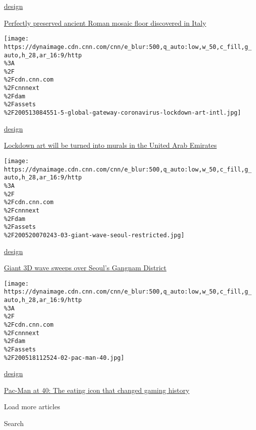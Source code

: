 \href{/style/design}{design}

\href{/style/article/negrar-mosaic-floor-italy-discovery-scli-intl/index.html}{Perfectly
preserved ancient Roman mosaic floor discovered in Italy}

\href{/style/article/dubai-lockdown-art-spc-intl/index.html}{}

\texttt{[image: https://dynaimage.cdn.cnn.com/cnn/e\_blur:500,q\_auto:low,w\_50,c\_fill,g\_auto,h\_28,ar\_16:9/http\\\%3A\\\%2F\\\%2Fcdn.cnn.com\\\%2Fcnnnext\\\%2Fdam\\\%2Fassets\\\%2F200513084551-5-global-gateway-coronavirus-lockdown-art-intl.jpg]}

\href{/style/design}{design}

\href{/style/article/dubai-lockdown-art-spc-intl/index.html}{Lockdown
art will be turned into murals in the United Arab Emirates}

\href{/style/article/3d-wave-in-seoul/index.html}{}

\texttt{[image: https://dynaimage.cdn.cnn.com/cnn/e\_blur:500,q\_auto:low,w\_50,c\_fill,g\_auto,h\_28,ar\_16:9/http\\\%3A\\\%2F\\\%2Fcdn.cnn.com\\\%2Fcnnnext\\\%2Fdam\\\%2Fassets\\\%2F200520070243-03-giant-wave-seoul-restricted.jpg]}

\href{/style/design}{design}

\href{/style/article/3d-wave-in-seoul/index.html}{Giant 3D wave sweeps
over Seoul's Gangnam District}

\href{/style/article/pac-man-40-anniversary-history/index.html}{}

\texttt{[image: https://dynaimage.cdn.cnn.com/cnn/e\_blur:500,q\_auto:low,w\_50,c\_fill,g\_auto,h\_28,ar\_16:9/http\\\%3A\\\%2F\\\%2Fcdn.cnn.com\\\%2Fcnnnext\\\%2Fdam\\\%2Fassets\\\%2F200518112524-02-pac-man-40.jpg]}

\href{/style/design}{design}

\href{/style/article/pac-man-40-anniversary-history/index.html}{Pac-Man
at 40: The eating icon that changed gaming history}

Load more articles

Search

